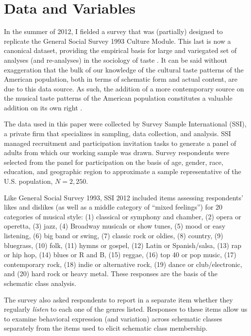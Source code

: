 \documentclass[preprint, authoryear,11pt, 3p]{elsarticle}
\begin{document}
\section{Data and Variables}
In the summer of 2012, I fielded a survey that was (partially) designed to replicate the General Social Survey 1993 Culture Module. This last is now a canonical dataset, providing the empirical basis for large and variegated set of analyses (and re-analyses) in the sociology of taste \citep[][among others]{boutyline2017improving, bryson1996anything,bryson1997univores, goldberg2011mapping, han2003unraveling, okada2017structure, tampubolon2008revisiting}. It can be said without exaggeration that the bulk of our knowledge of the cultural taste patterns of the American population, both in terms of schematic form and actual content, are due to this data source. As such, the addition of a more contemporary source on the musical taste patterns of the American population constitutes a valuable addition on its own right \citep{lizardo2016cultural, lizardo2016end, lizardo2015musical}.

The data used in this paper were collected by Survey Sample International (SSI), a private firm that specializes in sampling, data collection, and analysis. SSI managed recruitment and participation invitation tasks to generate a panel of adults from which our working sample was drawn. Survey respondents were selected from the panel for participation on the basis of age, gender, race, education, and geographic region to approximate a sample representative of the U.S. population, $N = 2,250$.

Like General Social Survey 1993, SSI 2012 included items assessing respondents’ likes and dislikes (as well as a middle category of ``mixed feelings'') for 20 categories of musical style: (1) classical or symphony and chamber, (2) opera or operetta, (3) jazz, (4) Broadway musicals or show tunes, (5) mood or easy listening, (6) big band or swing, (7) classic rock or oldies, (8) country, (9) bluegrass, (10) folk, (11) hymns or gospel, (12) Latin or Spanish/salsa, (13) rap or hip hop, (14) blues or R and B, (15) reggae, (16) top 40 or pop music, (17) contemporary rock, (18) indie or alternative rock, (19) dance or club/electronic, and (20) hard rock or heavy metal. These responses are the basis of the schematic class analysis. 

The survey also asked respondents to report in a separate item whether they regularly {\em listen} to each one of the genres listed. Responses to these items allow us to examine behavioral expression (and variation) across schematic classes separately from the items used to elicit schematic class membership.
\end{document}
